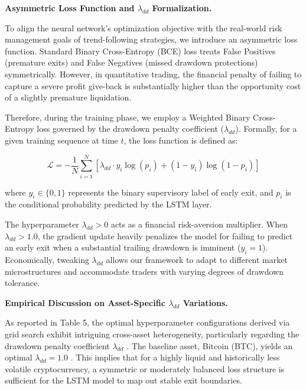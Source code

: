 \documentclass{article}
\begin{document}
\noindent \textbf{Asymmetric Loss Function and $\lambda_{dd}$ Formalization.} 

To align the neural network's optimization objective with the real-world risk management goals of trend-following strategies, we introduce an asymmetric loss function. Standard Binary Cross-Entropy (BCE) loss treats False Positives (premature exits) and False Negatives (missed drawdown protections) symmetrically. However, in quantitative trading, the financial penalty of failing to capture a severe profit give-back is substantially higher than the opportunity cost of a slightly premature liquidation. 

Therefore, during the training phase, we employ a Weighted Binary Cross-Entropy loss governed by the drawdown penalty coefficient ($\lambda_{dd}$). Formally, for a given training sequence at time $t$, the loss function is defined as:

\begin{equation}
\mathcal{L} = - \frac{1}{N} \sum_{i=1}^{N} \left[ \lambda_{dd} \cdot y_i \log(p_i) + (1 - y_i) \log(1 - p_i) \right]
\end{equation}

where $y_i \in \{0, 1\}$ represents the binary supervisory label of early exit, and $p_i$ is the conditional probability predicted by the LSTM layer. 

The hyperparameter $\lambda_{dd} > 0$ acts as a financial risk-aversion multiplier. When $\lambda_{dd} > 1.0$, the gradient update heavily penalizes the model for failing to predict an early exit when a substantial trailing drawdown is imminent ($y_i = 1$). Economically, tweaking $\lambda_{dd}$ allows our framework to adapt to different market microstructures and accommodate traders with varying degrees of drawdown tolerance.

\vspace{0.5em}
\noindent \textbf{Empirical Discussion on Asset-Specific $\lambda_{dd}$ Variations.} 

As reported in Table 5, the optimal hyperparameter configurations derived via grid search exhibit intriguing cross-asset heterogeneity, particularly regarding the drawdown penalty coefficient $\lambda_{dd}$ \cite{source1}. The baseline asset, Bitcoin (BTC), yields an optimal $\lambda_{dd} = 1.0$ \cite{source1}. This implies that for a highly liquid and historically less volatile cryptocurrency, a symmetric or moderately balanced loss structure is sufficient for the LSTM model to map out stable exit boundaries. 
\end{document}
